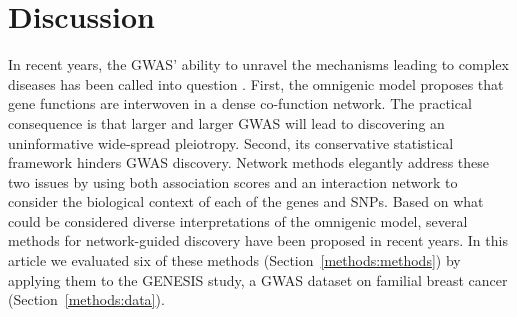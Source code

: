 \documentclass[10pt,letterpaper]{article}
\begin{document}
\section{Discussion}

In recent years, the GWAS' ability to unravel the mechanisms leading to complex diseases has been called into question \cite{boyle_expanded_2017}. First, the omnigenic model proposes that gene functions are interwoven in a dense co-function network. The practical consequence is that larger and larger GWAS will lead to discovering an uninformative wide-spread pleiotropy. Second, its conservative statistical framework hinders GWAS discovery. Network methods elegantly address these two issues by using both association scores and an interaction network to consider the biological context of each of the genes and SNPs. Based on what could be considered diverse interpretations of the omnigenic model, several methods for network-guided discovery have been proposed in recent years. In this article we evaluated six of these methods (Section~\ref{methods:methods}) by applying them to the GENESIS study, a GWAS dataset on familial breast cancer (Section~\ref{methods:data}).
\end{document}
